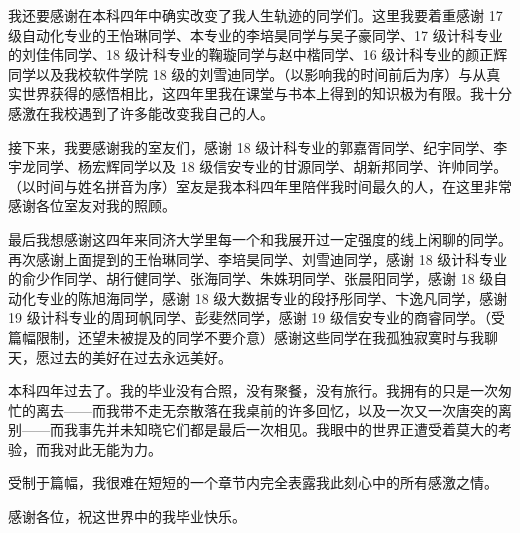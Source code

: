 我还要感谢在本科四年中确实改变了我人生轨迹的同学们。这里我要着重感谢 17 级自动化专业的王怡琳同学、本专业的李培昊同学与吴子豪同学、17 级计科专业的刘佳伟同学、18 级计科专业的鞠璇同学与赵中楷同学、16 级计科专业的颜正辉同学以及我校软件学院 18 级的刘雪迪同学。（以影响我的时间前后为序）与从真实世界获得的感悟相比，这四年里我在课堂与书本上得到的知识极为有限。我十分感激在我校遇到了许多能改变我自己的人。

接下来，我要感谢我的室友们，感谢 18 级计科专业的郭嘉胥同学、纪宇同学、李宇龙同学、杨宏辉同学以及 18 级信安专业的甘源同学、胡新邦同学、许帅同学。（以时间与姓名拼音为序）室友是我本科四年里陪伴我时间最久的人，在这里非常感谢各位室友对我的照顾。

最后我想感谢这四年来同济大学里每一个和我展开过一定强度的线上闲聊的同学。再次感谢上面提到的王怡琳同学、李培昊同学、刘雪迪同学，感谢 18 级计科专业的俞少作同学、胡行健同学、张海同学、朱姝{玥}同学、张晨阳同学，感谢 18 级自动化专业的陈旭海同学，感谢 18 级大数据专业的段抒彤同学、卞逸凡同学，感谢 19 级计科专业的周珂帆同学、彭斐然同学，感谢 19 级信安专业的商睿同学。（受篇幅限制，还望未被提及的同学不要介意）感谢这些同学在我孤独寂寞时与我聊天，愿过去的美好在过去永远美好。

本科四年过去了。我的毕业没有合照，没有聚餐，没有旅行。我拥有的只是一次匆忙的离去——而我带不走无奈散落在我桌前的许多回忆，以及一次又一次唐突的离别——而我事先并未知晓它们都是最后一次相见。我眼中的世界正遭受着莫大的考验，而我对此无能为力。

受制于篇幅，我很难在短短的一个章节内完全表露我此刻心中的所有感激之情。

感谢各位，祝这世界中的我毕业快乐。
